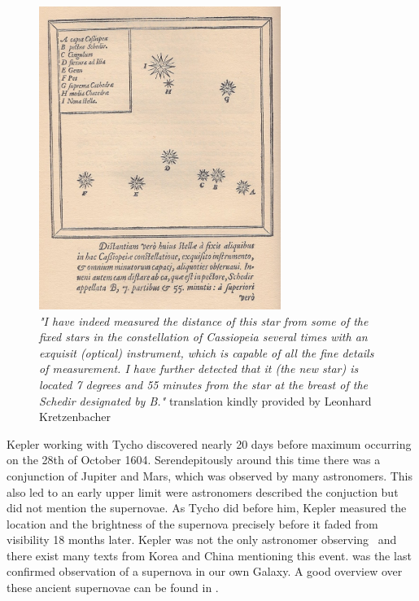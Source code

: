 \begin{figure}[htbp] %
   \centering
   \includegraphics[width=0.7\textwidth]{chapter_intro/plots/Tycho_Cas_SN1572.jpg} 
   \caption[Star chart of SN 1572 by Tycho Brahe]{\textit{"I have indeed measured the distance of this star from some of the fixed stars in the constellation of Cassiopeia several times with an exquisit (optical) instrument, which is capable of all the fine details of measurement. I have further detected that it (the new star) is located 7 degrees and 55 minutes from the star at the breast of the Schedir designated by B."} translation kindly provided by Leonhard Kretzenbacher}
   \label{fig:sn1572_tycho_chart}
\end{figure}

Kepler working with Tycho discovered  nearly 20 days before maximum occurring on the 28th of October 1604. Serendepitously around this time there was a conjunction of Jupiter and Mars, which was observed by many astronomers. This also led to an early upper limit were astronomers described the conjuction but did not mention the supernovae. As Tycho did before him, Kepler measured the location and the brightness of the supernova precisely \citep[see Figure \ref{fig:sn1604_ancient_lc};][]{kepler1606} before it faded from visibility 18 months later. Kepler was not the only astronomer observing \ and there exist many texts from Korea and China mentioning this event.  was the last confirmed observation of a supernova in our own Galaxy. A good overview over these ancient supernovae can be found in \citet{2003LNP...598....7G}.

